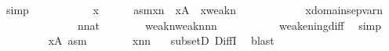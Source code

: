 \begin{isabellebody}
\ simp\isanewline
\ \ \isamarkupfalse%
\isanewline
\ \ \isacommand{{\isacharbraceleft}{\kern0pt}}\isamarkupfalse%
\isanewline
\ \ \ \ \isamarkupfalse%
\ x\isanewline
\ \ \ \ \isamarkupfalse%
\ asm{\isacharcolon}{\kern0pt}{\isachardoublequoteopen}x{\isasymin}{}{\isacharhash}{\kern0pt}{\isacharplus}{\kern0pt}n{\isachardoublequoteclose}\ \ {\isachardoublequoteopen}x{\isasymnotin}{\isacharquery}{\kern0pt}A{\isachardoublequoteclose}\ \ {\isachardoublequoteopen}x{\isasymin}weak{\isacharparenleft}{\kern0pt}n{\isacharcomma}{\kern0pt}{}{\isacharparenright}{\kern0pt}{\isachardoublequoteclose}\isanewline
\ \ \ \ \isamarkupfalse%
\ \isanewline
\ \ \ \ \isamarkupfalse%
\ {\isachardoublequoteopen}x{\isasymin}domain{\isacharparenleft}{\kern0pt}sep{\isacharunderscore}{\kern0pt}var{\isacharparenleft}{\kern0pt}n{\isacharparenright}{\kern0pt}{\isacharparenright}{\kern0pt}{\isachardoublequoteclose}\ \isanewline
\ \ \ \ \isamarkupfalse%
\ {\isacharminus}{\kern0pt}\isanewline
\ \ \ \ \ \ \isamarkupfalse%
\ {\isacartoucheopen}n{\isasymin}nat{\isacartoucheclose}\isanewline
\ \ \ \ \ \ \isamarkupfalse%
\ {\isachardoublequoteopen}weak{\isacharparenleft}{\kern0pt}n{\isacharcomma}{\kern0pt}{}{\isacharparenright}{\kern0pt}{\isacharminus}{\kern0pt}weak{\isacharparenleft}{\kern0pt}n{\isacharcomma}{\kern0pt}{}{\isacharparenright}{\kern0pt}{\isasymsubseteq}{\isacharbraceleft}{\kern0pt}n{\isacharhash}{\kern0pt}{\isacharplus}{\kern0pt}{}{\isacharcomma}{\kern0pt}n{\isacharhash}{\kern0pt}{\isacharplus}{\kern0pt}{}{\isacharbraceright}{\kern0pt}{\isachardoublequoteclose}\ \isanewline
\ \ \ \ \ \ \ \ \isamarkupfalse%
\ weakening{\isacharunderscore}{\kern0pt}diff\ \isamarkupfalse%
\ simp\isanewline
\ \ \ \ \ \ \isamarkupfalse%
\ \ {\isacartoucheopen}x{\isasymnotin}{\isacharquery}{\kern0pt}A{\isacartoucheclose}\ asm\isanewline
\ \ \ \ \ \ \isamarkupfalse%
\ {\isachardoublequoteopen}x{\isasymin}{\isacharbraceleft}{\kern0pt}n{\isacharhash}{\kern0pt}{\isacharplus}{\kern0pt}{}{\isacharcomma}{\kern0pt}n{\isacharhash}{\kern0pt}{\isacharplus}{\kern0pt}{}{\isacharbraceright}{\kern0pt}{\isachardoublequoteclose}\ \isamarkupfalse%
\ \ subsetD\ DiffI\ \isamarkupfalse%
\ blast\isanewline
\ \ \ \ \ \ \isamarkupfalse%
\ \isanewline
\ \ \ \ \ \ \isamarkupfalse%

\end{isabellebody}
